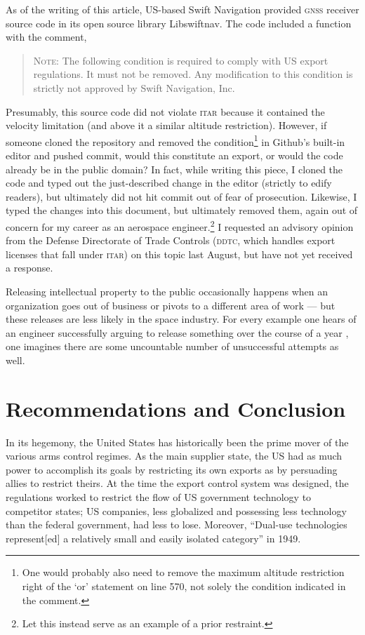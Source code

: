 \documentclass[12pt]{olfmemo}
\begin{document}
As of the writing of this article, US-based Swift Navigation provided \textsc{gnss} receiver source code in its open source library Libswiftnav. The code included a function with the comment,
\begin{quote}
\textsc{Note}: The following condition is required to comply with US export regulations. It must not be removed. Any modification to this condition is strictly not approved by Swift Navigation, Inc. \citep{Libswiftnav575}
\end{quote}
Presumably, this source code did not violate \textsc{itar} because it contained the velocity limitation (and above it a similar altitude restriction). However, if someone cloned the repository and removed the condition\footnote{One would probably also need to remove the maximum altitude restriction right of the `or' statement on line 570, not solely the condition indicated in the comment.} in Github's built-in editor and pushed commit, would this constitute an export, or would the code already be in the public domain? In fact, while writing this piece, I cloned the code and typed out the just-described change in the editor (strictly to edify readers), but ultimately did not hit commit out of fear of prosecution. Likewise, I typed the changes into this document, but ultimately removed them, again out of concern for my career as an aerospace engineer.\footnote{Let this instead serve as an example of a prior restraint.} I requested an advisory opinion from the Defense Directorate of Trade Controls (\textsc{ddtc}, which handles export licenses that fall under \textsc{itar}) on this topic last August, but have not yet received a response.

Releasing intellectual property to the public occasionally happens when an organization goes out of business or pivots to a different area of work --- but these releases are less likely in the space industry. For every example one hears of an engineer successfully arguing to release something over the course of a year \citep{Scoles2017}, one imagines there are some uncountable number of unsuccessful attempts as well.

\section{Recommendations and Conclusion}
In its hegemony, the United States has historically been the prime mover of the various arms control regimes. As the main supplier state, the US had as much power to accomplish its goals by restricting its own exports as by persuading allies to restrict theirs. At the time the export control system was designed, the regulations worked to restrict the flow of US government technology to competitor states; US companies, less globalized and possessing less technology than the federal government, had less to lose. Moreover, ``Dual-use technologies represent[ed] a relatively small and easily isolated category'' in 1949. \citep{Kuttner1991}
\end{document}
